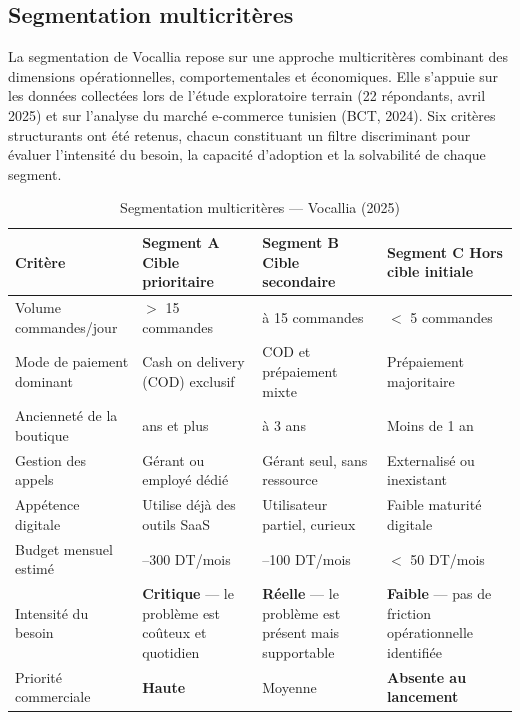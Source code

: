 \subsection{Segmentation multicritères}
\label{section3.1.1}

La segmentation de Vocallia repose sur une approche multicritères combinant des dimensions opérationnelles, comportementales et économiques. Elle s'appuie sur les données collectées lors de l'étude exploratoire terrain (22 répondants, avril 2025) et sur l'analyse du marché e-commerce tunisien (BCT, 2024). Six critères structurants ont été retenus, chacun constituant un filtre discriminant pour évaluer l'intensité du besoin, la capacité d'adoption et la solvabilité de chaque segment.

\begin{table}[H]
\centering
\caption{Segmentation multicritères --- Vocallia (2025)}
\vspace{4pt}
\begin{tabularx}{\textwidth}{|>{\raggedright\arraybackslash}p{3cm}|>{\raggedright\arraybackslash}X|>{\raggedright\arraybackslash}X|>{\raggedright\arraybackslash}X|}
\hline
\textbf{Critère} & \textbf{Segment A \newline Cible prioritaire} & \textbf{Segment B \newline Cible secondaire} & \textbf{Segment C \newline Hors cible initiale} \\
\hline
Volume commandes/jour & $>$ 15 commandes & 6 à 15 commandes & $<$ 5 commandes \\
\hline
Mode de paiement dominant & Cash on delivery (COD) exclusif & COD et prépaiement mixte & Prépaiement majoritaire \\
\hline
Ancienneté de la boutique & 3 ans et plus & 1 à 3 ans & Moins de 1 an \\
\hline
Gestion des appels & Gérant ou employé dédié & Gérant seul, sans ressource & Externalisé ou inexistant \\
\hline
Appétence digitale & Utilise déjà des outils SaaS & Utilisateur partiel, curieux & Faible maturité digitale \\
\hline
Budget mensuel estimé & 100--300 DT/mois & 50--100 DT/mois & $<$ 50 DT/mois \\
\hline
Intensité du besoin & \textbf{Critique} --- le problème est coûteux et quotidien & \textbf{Réelle} --- le problème est présent mais supportable & \textbf{Faible} --- pas de friction opérationnelle identifiée \\
\hline
Priorité commerciale & \textbf{Haute} & Moyenne & \textbf{Absente au lancement} \\
\hline
\end{tabularx}
\end{table}

